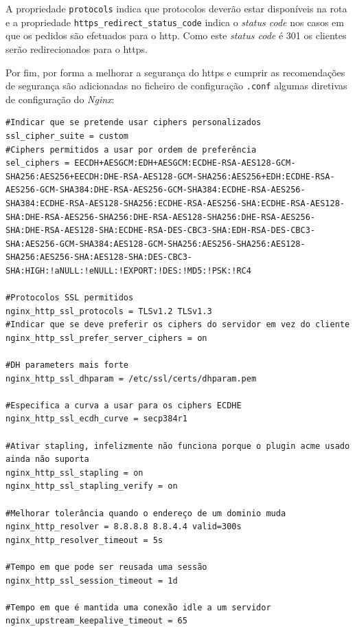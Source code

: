 A propriedade \texttt{protocols} indica que protocolos deverão estar disponíveis na rota e a propriedade \texttt{https\_redirect\_status\_code} indica o \textit{status code} nos casos em que os pedidos são efetuados para o \acrshort{http}. Como este \textit{status code} é 301 os clientes serão redirecionados para o \acrshort{https}.

Por fim, por forma a melhorar a segurança do \acrshort{https} e cumprir as recomendações de segurança são adicionadas no ficheiro de configuração \texttt{.conf} algumas diretivas de configuração do \textit{Nginx}:

\begin{lstlisting}[caption=Configurações do \textit{Nginx} no ficheiro de configuração \texttt{.conf}]
#Indicar que se pretende usar ciphers personalizados
ssl_cipher_suite = custom
#Ciphers permitidos a usar por ordem de preferência
sel_ciphers = EECDH+AESGCM:EDH+AESGCM:ECDHE-RSA-AES128-GCM-SHA256:AES256+EECDH:DHE-RSA-AES128-GCM-SHA256:AES256+EDH:ECDHE-RSA-AES256-GCM-SHA384:DHE-RSA-AES256-GCM-SHA384:ECDHE-RSA-AES256-SHA384:ECDHE-RSA-AES128-SHA256:ECDHE-RSA-AES256-SHA:ECDHE-RSA-AES128-SHA:DHE-RSA-AES256-SHA256:DHE-RSA-AES128-SHA256:DHE-RSA-AES256-SHA:DHE-RSA-AES128-SHA:ECDHE-RSA-DES-CBC3-SHA:EDH-RSA-DES-CBC3-SHA:AES256-GCM-SHA384:AES128-GCM-SHA256:AES256-SHA256:AES128-SHA256:AES256-SHA:AES128-SHA:DES-CBC3-SHA:HIGH:!aNULL:!eNULL:!EXPORT:!DES:!MD5:!PSK:!RC4

#Protocolos SSL permitidos
nginx_http_ssl_protocols = TLSv1.2 TLSv1.3
#Indicar que se deve preferir os ciphers do servidor em vez do cliente
nginx_http_ssl_prefer_server_ciphers = on

#DH parameters mais forte
nginx_http_ssl_dhparam = /etc/ssl/certs/dhparam.pem

#Especifica a curva a usar para os ciphers ECDHE
nginx_http_ssl_ecdh_curve = secp384r1

#Ativar stapling, infelizmente não funciona porque o plugin acme usado ainda não suporta
nginx_http_ssl_stapling = on
nginx_http_ssl_stapling_verify = on

#Melhorar tolerância quando o endereço de um dominio muda
nginx_http_resolver = 8.8.8.8 8.8.4.4 valid=300s
nginx_http_resolver_timeout = 5s

#Tempo em que pode ser reusada uma sessão
nginx_http_ssl_session_timeout = 1d

#Tempo em que é mantida uma conexão idle a um servidor
nginx_upstream_keepalive_timeout = 65
\end{lstlisting}

